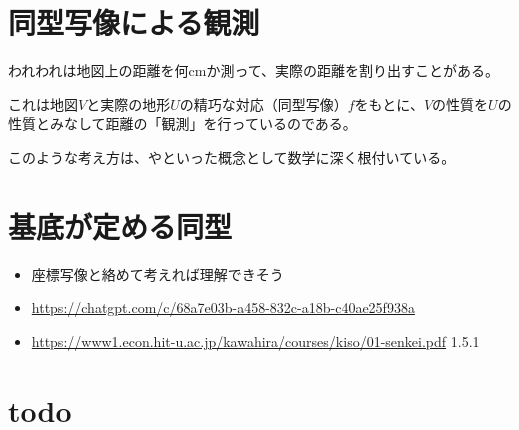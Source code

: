 \documentclass[../../../topic_linear-algebra]{subfiles}
\begin{document}
\sectionline
\section{同型写像による観測}

われわれは地図上の距離を何cmか測って、実際の距離を割り出すことがある。

これは地図$V$と実際の地形$U$の精巧な対応（同型写像）$f$をもとに、$V$の性質を$U$の性質とみなして距離の「観測」を行っているのである。

\br

このような考え方は、やといった概念として数学に深く根付いている。

\sectionline
\section{基底が定める同型}

\begin{mindflow}
  \begin{itemize}
    \item 座標写像と絡めて考えれば理解できそう
    \item \url{https://chatgpt.com/c/68a7e03b-a458-832c-a18b-c40ae25f938a}
    \item \url{https://www1.econ.hit-u.ac.jp/kawahira/courses/kiso/01-senkei.pdf} 1.5.1
  \end{itemize}
\end{mindflow}

\sectionline
\section{todo}
\end{document}
